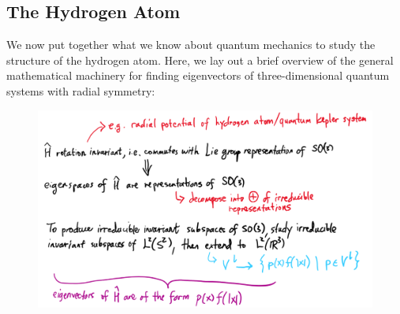 \subsection{The Hydrogen Atom}
We now put together what we know about quantum mechanics to study the structure of the hydrogen atom. Here, we lay out a brief overview of the general mathematical machinery for finding eigenvectors of three-dimensional quantum systems with radial symmetry:
\begin{figure}[ht]
    \includegraphics[width=\textwidth]{figures/quantum_kepler}
    \centering
\end{figure}
